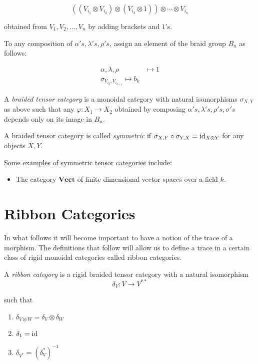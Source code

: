 \begin{equation}
    ( (V_{i_1}\otimes V_{i_2}) \otimes (V_{i_3} \otimes 1)) \otimes \cdots \otimes V_{i_n}
\end{equation}

obtained from $V_1,V_2,\ldots,V_n$ by adding brackets and $1$'s.

To any composition of $\alpha's, \lambda's, \rho's$, assign an element of the
braid group $B_n$ as follows:

\begin{align}
    \alpha, \lambda, \rho &\mapsto 1 \\
    \sigma_{V_{i_k}, V_{i_{k+1}}} \mapsto b_k
\end{align}

\begin{defn}
    A \emph{braided tensor category} is a monoidal category with natural
    isomorphisms $\sigma_{X,Y}$ as above such that any $\varphi: X_1 \to X_2$
    obtained by composing $\alpha's, \lambda's, \rho's, \sigma's$ depends only
    on its image in $B_n$.
\end{defn}

\begin{defn}
    A braided tensor category is called \emph{symmetric} if $\sigma_{X,Y} \circ
    \sigma_{Y,X} = \operatorname{id}_{X \otimes Y}$ for any objects $X,Y$.
\end{defn}

Some examples of symmetric tensor categories include:

\begin{itemize}
    \item The category $\mathbf{Vect}$ of finite dimensional vector spaces over a field $k$.
\end{itemize}

\section{Ribbon Categories}
\label{section:RibbonCategories}

In what follows it will become important to have a notion of the trace of a
morphism. The definitions that follow will allow us to define a trace in a
certain class of rigid monoidal categories called ribbon categories.

\begin{defn}

    A \emph{ribbon category} is a rigid braided tensor category with a natural
    isomorphism
    \begin{equation}
        \delta_V: V \to V^{**}
    \end{equation}

such that 
\begin{enumerate}
    \renewcommand{\labelenumi}{\roman{enumi})}

    \item $\delta_{V \otimes W} = \delta_V \otimes \delta_W$
    \item $\delta_1 = \operatorname{id}$
    \item $\delta_{V^*} = (\delta_V^*)^{-1}$
\end{enumerate}

\end{defn}

